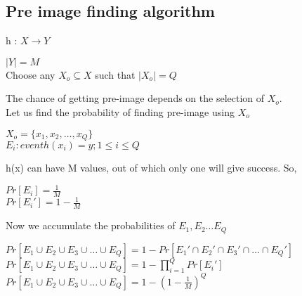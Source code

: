 \documentclass[11pt]{article}
\begin{document}
\subsection{Pre image finding algorithm}
\begin{center}
    h : $X \rightarrow Y$
\end{center}
$|Y|=M$\\
Choose any $X_o \subseteq X$ such that $|X_o| = Q$\\
\begin{center}


\end{center}
The chance of getting pre-image depends on the selection of $X_o$. \\
\newline
Let us find the probability of finding pre-image using $X_o$\\
\begin{center}
    $X_o = \{x_1, x_2, \dots , x_Q \}$\\
    $E_i : event h(x_i) = y; 1 \leq i \leq Q$
\end{center}
h(x) can have M values, out of which only one will give success. So,
\begin{center}
    $Pr[E_i] = \frac{1}{M}$\\
    $Pr[{E_i}'] = 1- \frac{1}{M}$
\end{center}
Now we accumulate the probabilities of $E_1, E_2 \dots E_Q$
\begin{center}
    $Pr[E_1 \cup E_2 \cup E_3 \cup \dots \cup E_Q] = 1 - Pr[{E_1}' \cap {E_2}' \cap {E_3}' \cap \dots \cap {E_Q}']$\\
    \vspace{3mm}
    $Pr[E_1 \cup E_2 \cup E_3 \cup \dots \cup E_Q] = 1 - \prod_{i=1}^{Q} Pr[{E_i}']$\\
    \vspace{3mm}
    $Pr[E_1 \cup E_2 \cup E_3 \cup \dots \cup E_Q] = 1 - {(1-\frac{1}{M})}^Q$
\end{center}
\end{document}
